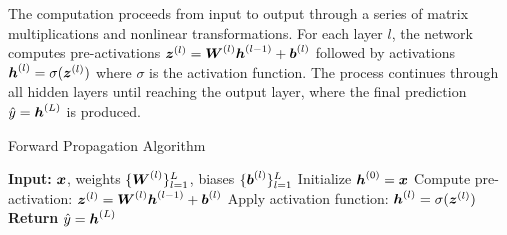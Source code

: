 The computation proceeds from input to output through a series of matrix multiplications and nonlinear transformations. For each layer $l$, the network computes pre-activations $\boldsymbol{z}^{(l)} = \boldsymbol{W}^{(l)} \boldsymbol{h}^{(l-1)} + \boldsymbol{b}^{(l)}$ followed by activations $\boldsymbol{h}^{(l)} = \sigma(\boldsymbol{z}^{(l)})$ where $\sigma$ is the activation function. The process continues through all hidden layers until reaching the output layer, where the final prediction $\hat{y} = \boldsymbol{h}^{(L)}$ is produced.

\begin{algorithm}[htbp]
\caption{Forward Propagation Algorithm}
\label{alg:forward-propagation}
\begin{algorithmic}[1]
\State \textbf{Input:} $\boldsymbol{x}$, weights $\{\boldsymbol{W}^{(l)}\}_{l=1}^{L}$, biases $\{\boldsymbol{b}^{(l)}\}_{l=1}^{L}$
\State Initialize $\boldsymbol{h}^{(0)} = \boldsymbol{x}$
    \State Compute pre-activation: $\boldsymbol{z}^{(l)} = \boldsymbol{W}^{(l)} \boldsymbol{h}^{(l-1)} + \boldsymbol{b}^{(l)}$
    \State Apply activation function: $\boldsymbol{h}^{(l)} = \sigma(\boldsymbol{z}^{(l)})$
\EndFor
\State \textbf{Return} $\hat{y} = \boldsymbol{h}^{(L)}$
\end{algorithmic}
\end{algorithm}

